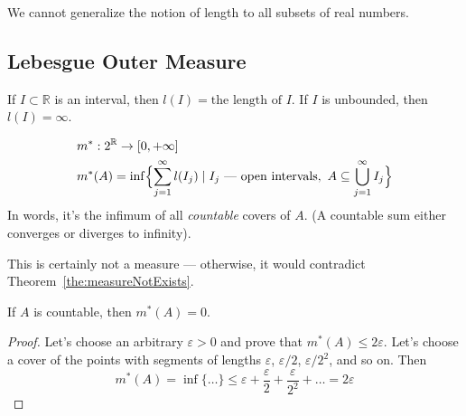 \begin{consequence}
    We cannot generalize the notion of length to all subsets of real numbers.
\end{consequence}

\subsection{Lebesgue Outer Measure}
\begin{definition}
    If $I \subset \mathbb{R}$ is an interval, then
    $l(I) = \text{the length of $I$}$. If $I$ is unbounded, then $l(I) = \infty$.
\end{definition}
\begin{definition}
    \begin{align*}
        &
        m^* : 2^{\mathbb{R}} \to [0, +\infty]
        \\&
        m^*(A) = \inf \Bigl\{ \sum_{j = 1}^{\infty} l(I_j) \mid 
        I_j \text{ --- open intervals},\ A \subseteq \bigcup_{j=1}^{\infty} I_j\Bigr\}
    \end{align*}
    In words, it's the infimum of all \textit{countable} covers of $A$.
    (A countable sum either converges or diverges to infinity).
\end{definition}
\begin{remark}
    This is certainly not a measure --- otherwise, it would contradict Theorem~\ref{the:measureNotExists}.
\end{remark}

\begin{example}
    If $A$ is countable, then $m^*(A) = 0$.
\end{example}
\begin{proof}
    Let's choose an arbitrary $\varepsilon > 0$ and prove that $m^*(A) \le 2\varepsilon$.
    Let's choose a cover of the points with segments of lengths $\varepsilon$, $\varepsilon / 2$, $\varepsilon / 2^2$, and so on.
    Then \[
        m^*(A) = \inf \{\dots\} \le \varepsilon + \frac{\varepsilon}{2} + \frac{\varepsilon}{2^2} + \dots = 2\varepsilon
    \]
\end{proof}


